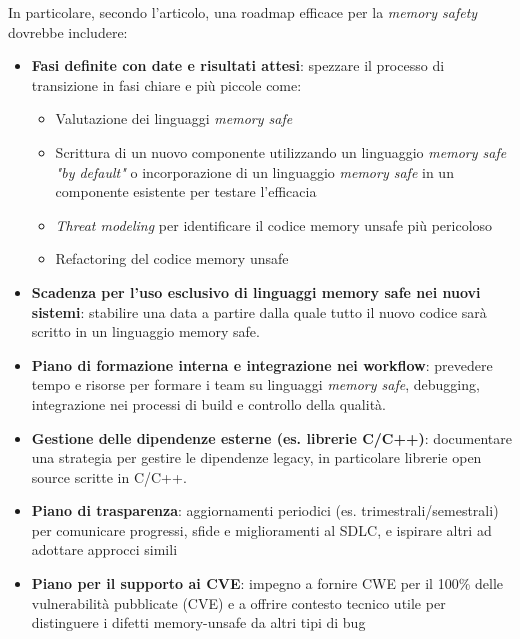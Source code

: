 In particolare, secondo l'articolo, una roadmap efficace per la \textit{memory
safety} dovrebbe includere:

\begin{itemize}
  \item \textbf{Fasi definite con date e risultati attesi}: spezzare il processo
    di transizione in fasi chiare e più piccole come:
    \begin{itemize}
      \item Valutazione dei linguaggi \textit{memory safe}

      \item Scrittura di un nuovo componente utilizzando un linguaggio \textit{memory
        safe "by default"} o incorporazione di un linguaggio \textit{memory safe}
        in un componente esistente per testare l'efficacia

      \item \textit{Threat modeling} per identificare il codice memory unsafe
        più pericoloso

      \item Refactoring del codice memory unsafe
    \end{itemize}

  \item \textbf{Scadenza per l'uso esclusivo di linguaggi memory safe nei nuovi
    sistemi}: stabilire una data a partire dalla quale tutto il nuovo codice sarà
    scritto in un linguaggio memory safe.

  \item \textbf{Piano di formazione interna e integrazione nei workflow}: prevedere
    tempo e risorse per formare i team su linguaggi \textit{memory safe}, debugging,
    integrazione nei processi di build e controllo della qualità.

  \item \textbf{Gestione delle dipendenze esterne (es. librerie C/C++)}: documentare
    una strategia per gestire le dipendenze legacy, in particolare librerie open
    source scritte in C/C++.

  \item \textbf{Piano di trasparenza}: aggiornamenti periodici (es. trimestrali/semestrali)
    per comunicare progressi, sfide e miglioramenti al SDLC, e ispirare altri ad
    adottare approcci simili

  \item \textbf{Piano per il supporto ai CVE}: impegno a fornire CWE per il 100\%
    delle vulnerabilità pubblicate (CVE) e a offrire contesto tecnico utile per
    distinguere i difetti memory-unsafe da altri tipi di bug
\end{itemize}


